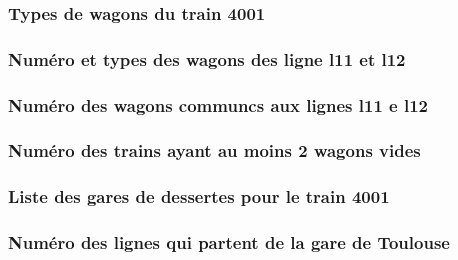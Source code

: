 \subsubsection{Types de wagons du train 4001}
\subsubsection{Numéro et types des wagons des ligne l11 et l12}
\subsubsection{Numéro des wagons communcs aux lignes l11 e l12}
\subsubsection{Numéro des trains ayant au moins 2 wagons vides}
\subsubsection{Liste des gares de dessertes pour le train 4001}
\subsubsection{Numéro des lignes qui partent de la gare de Toulouse}
